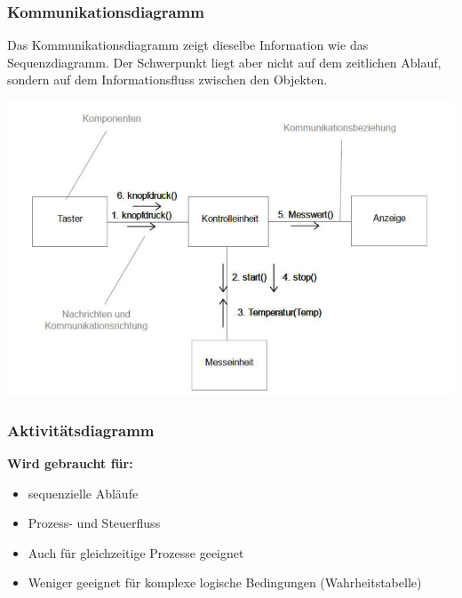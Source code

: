 \subsubsection{Kommunikationsdiagramm}
\begin{minipage}[][][t]{0.4\linewidth}
	Das Kommunikationsdiagramm zeigt dieselbe Information wie das Sequenzdiagramm. Der Schwerpunkt liegt aber
	nicht auf dem zeitlichen Ablauf, sondern auf dem Informationsfluss zwischen den Objekten.
\end{minipage}%
\begin{minipage}{0.6\linewidth}
	\begin{center}
		\includegraphics[width=0.8\linewidth]{images/Modellierung/Kommunikationsdiagramm}
	\end{center}
\end{minipage}

\subsubsection{Aktivitätsdiagramm}
\textbf{Wird gebraucht für:}
\begin{itemize}
	\item sequenzielle Abläufe
	\item Prozess- und Steuerfluss
	\item Auch für gleichzeitige Prozesse geeignet
	\item Weniger geeignet für komplexe logische Bedingungen (Wahrheitstabelle)
\end{itemize}

